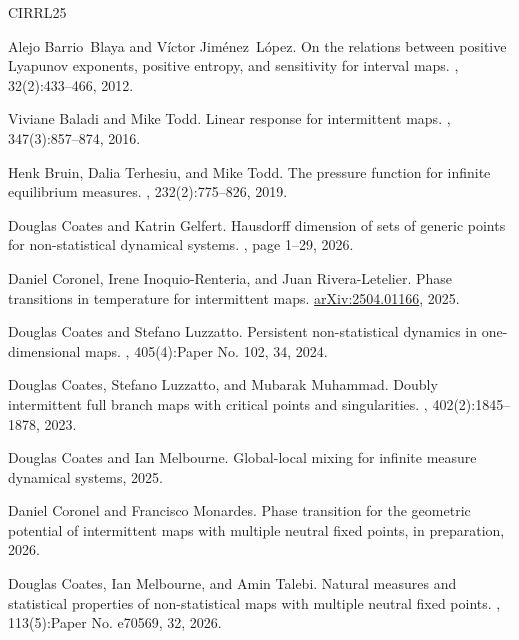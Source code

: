 \documentclass[12pt]{amsart}
\numberwithin{equation}{section} %
\numberwithin{figure}{section} %
\theoremstyle{plain}
\theoremstyle{definition}
\theoremstyle{remark}
\theoremstyle{citing}
\renewcommand{\=}{\coloneqq}
\begin{document}
%
%
% 
\begin{thebibliography}{CIRRL25}

Alejo Barrio~Blaya and V\'ictor Jim\'enez~L\'opez.
\newblock On the relations between positive {L}yapunov exponents, positive entropy, and sensitivity for interval maps.
, 32(2):433--466, 2012.

Viviane Baladi and Mike Todd.
\newblock Linear response for intermittent maps.
, 347(3):857--874, 2016.

Henk Bruin, Dalia Terhesiu, and Mike Todd.
\newblock The pressure function for infinite equilibrium measures.
, 232(2):775--826, 2019.

Douglas Coates and Katrin Gelfert.
\newblock Hausdorff dimension of sets of generic points for non-statistical dynamical systems.
, page 1–29, 2026.

Daniel Coronel, Irene Inoquio-Renteria, and Juan Rivera-Letelier.
\newblock Phase transitions in temperature for intermittent maps.
\newblock \href{https://arxiv.org/abs/2504.01166} {arXiv:2504.01166}, 2025.

Douglas Coates and Stefano Luzzatto.
\newblock Persistent non-statistical dynamics in one-dimensional maps.
, 405(4):Paper No. 102, 34, 2024.

Douglas Coates, Stefano Luzzatto, and Mubarak Muhammad.
\newblock Doubly intermittent full branch maps with critical points and singularities.
, 402(2):1845--1878, 2023.

Douglas Coates and Ian Melbourne.
\newblock Global-local mixing for infinite measure dynamical systems, 2025.

Daniel Coronel and Francisco Monardes.
\newblock Phase transition for the geometric potential of intermittent maps with multiple neutral fixed points, in preparation, 2026.

Douglas Coates, Ian Melbourne, and Amin Talebi.
\newblock Natural measures and statistical properties of non-statistical maps with multiple neutral fixed points.
, 113(5):Paper No. e70569, 32, 2026.


\end{thebibliography}
\end{document}
